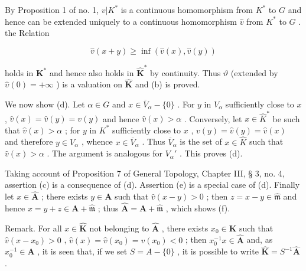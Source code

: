 By Proposition 1 of no. 1, \(v|K^*\) is a continuous homomorphism from \(K^*\) to \(G\) and hence can be extended uniquely to a continuous homomorphism \(\hat{v}\) from \(K^*\) to \(G\) . the Relation

\[
\hat {v} (x + y) \geqslant \inf (\hat {v} (x), \hat {v} (y))
\]

holds in \(\mathbf{K}^*\) and hence also holds in \(\hat{\mathbf{K}}^*\) by continuity. Thus \(\vartheta\) (extended by \(\hat{\upsilon}(0) = +\infty\) ) is a valuation on \(\hat{\mathbf{K}}\) and (b) is proved.

We now show (d). Let \(\alpha \in G\) and \(x \in \overline{V}_{\alpha} - \{0\}\) . For \(y\) in \(V_{\alpha}\) sufficiently close to \(x\) , \(\hat{v}(x) = \hat{v}(y) = v(y)\) and hence \(\hat{v}(x) > \alpha\) . Conversely, let \(x \in \widehat{K}^*\) be such that \(\hat{v}(x) > \alpha\) ; for \(y\) in \(K^*\) sufficiently close to \(x\) , \(v(y) = \hat{v}(y) = \hat{v}(x)\) and therefore \(y \in V_{\alpha}\) , whence \(x \in \overline{V}_{\alpha}\) . Thus \(\overline{V}_{\alpha}\) is the set of \(x \in \widehat{K}\) such that \(\hat{v}(x) > \alpha\) . The argument is analogous for \(V_{\alpha}'\) . This proves (d).

Taking account of Proposition 7 of General Topology, Chapter III, § 3, no. 4, assertion (c) is a consequence of (d). Assertion (e) is a special case of (d). Finally let \(x \in \hat{\mathbf{A}}\) ; there exists \(y \in \mathbf{A}\) such that \(\hat{v}(x - y) > 0\) ; then \(z = x - y \in \hat{\mathfrak{m}}\) and hence \(x = y + z \in \mathbf{A} + \hat{\mathfrak{m}}\) ; thus \(\hat{\mathbf{A}} = \mathbf{A} + \hat{\mathfrak{m}}\) , which shows (f).

Remark. For all \(x \in \hat{\mathbf{K}}\) not belonging to \(\hat{\mathbf{A}}\) , there exists \(x_0 \in \mathbf{K}\) such that \(\hat{v}(x - x_0) > 0\) , \(\hat{v}(x) = \hat{v}(x_0) = v(x_0) < 0\) ; then \(x_0^{-1}x \in \hat{\mathbf{A}}\) and, as \(x_0^{-1} \in \mathbf{A}\) , it is seen that, if we set \(S = A - \{0\}\) , it is possible to write \(\hat{\mathbf{K}} = S^{-1}\hat{\mathbf{A}}\) .


